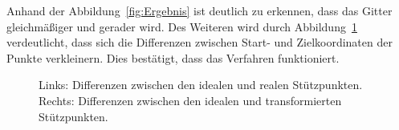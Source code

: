 Anhand der Abbildung~\ref{fig:Ergebnis} ist deutlich zu erkennen, dass das Gitter gleichmäßiger und gerader wird. Des Weiteren wird durch Abbildung~\ref{fig:diffsResult} verdeutlicht, dass sich die Differenzen zwischen Start- und Zielkoordinaten der Punkte verkleinern. Dies bestätigt, dass das Verfahren funktioniert.

\begin{figure}
	\caption{Links: Differenzen zwischen den idealen und realen Stützpunkten. \\Rechts: Differenzen zwischen den idealen und transformierten Stützpunkten.}
	\label{fig:diffsResult}
\end{figure}

